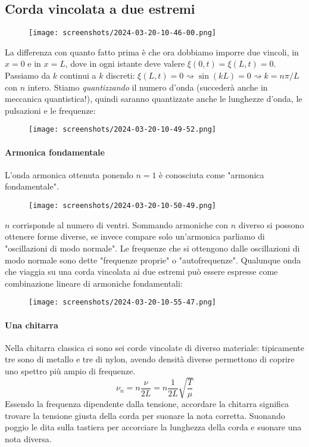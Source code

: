 \subsection{Corda vincolata a due estremi}
\begin{figure}[H]
	\centering
	\texttt{[image: screenshots/2024-03-20-10-46-00.png]}
\end{figure}
La differenza con quanto fatto prima è che ora dobbiamo imporre due vincoli, in \(x=0\) e in \(x=L\), dove in ogni istante deve valere \(\xi (0,t)=\xi (L,t)=0\). Passiamo da \(k\) continui a \(k\) discreti: \(\xi (L,t) = 0 \rightsquigarrow \sin (kL)=0\rightsquigarrow k=n \pi /L\) con \(n\) intero. Stiamo \emph{quantizzando} il numero d'onda (succederà anche in meccanica quantistica!), quindi saranno quantizzate anche le lunghezze d'onda, le pulsazioni e le frequenze:
\begin{figure}[H]
	\centering
	\texttt{[image: screenshots/2024-03-20-10-49-52.png]}
\end{figure}
\paragraph{Armonica fondamentale}
L'onda armonica ottenuta ponendo \(n=1\) è conosciuta come "armonica fondamentale".
\begin{figure}[H]
	\centering
	\texttt{[image: screenshots/2024-03-20-10-50-49.png]}
\end{figure}
\(n\) corrisponde al numero di ventri. Sommando armoniche con \(n\) diverso si possono ottenere forme diverse, se invece compare solo un'armonica parliamo di "oscillazioni di modo normale".
Le frequenze che si ottengono dalle oscillazioni di modo normale sono dette "frequenze proprie" o "autofrequenze". Qualunque onda che viaggia su una corda vincolata ai due estremi può essere espresse come combinazione lineare di armoniche fondamentali:
\begin{figure}[H]
	\centering
	\texttt{[image: screenshots/2024-03-20-10-55-47.png]}
\end{figure}
\paragraph{Una chitarra}
Nella chitarra classica ci sono sei corde vincolate di diverso materiale: tipicamente tre sono di metallo e tre di nylon, avendo densità diverse permettono di coprire uno spettro più ampio di frequenze.
\[
	\nu _n = n \frac{\nu }{2L} = n \frac{1}{2L} \sqrt{\frac{T}{\mu }} 
\]
Essendo la frequenza dipendente dalla tensione, accordare la chitarra significa trovare la tensione giusta della corda per suonare la nota corretta. Suonando poggio le dita sulla tastiera per accorciare la lunghezza della corda e suonare una nota diversa.